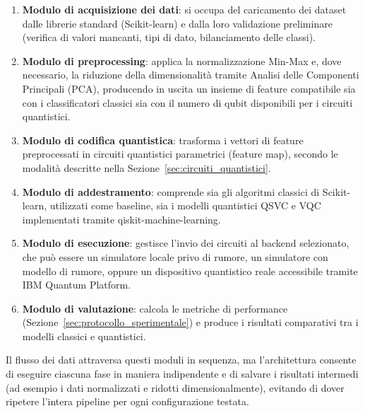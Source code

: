 \begin{enumerate}
    \item \textbf{Modulo di acquisizione dei dati}: si occupa del caricamento dei dataset dalle librerie standard (Scikit-learn) e dalla loro validazione preliminare (verifica di valori mancanti, tipi di dato, bilanciamento delle classi).
    \item \textbf{Modulo di preprocessing}: applica la normalizzazione Min-Max e, dove necessario, la riduzione della dimensionalità tramite Analisi delle Componenti Principali (PCA), producendo in uscita un insieme di feature compatibile sia con i classificatori classici sia con il numero di qubit disponibili per i circuiti quantistici.
    \item \textbf{Modulo di codifica quantistica}: trasforma i vettori di feature preprocessati in circuiti quantistici parametrici (feature map), secondo le modalità descritte nella Sezione~\ref{sec:circuiti_quantistici}.
    \item \textbf{Modulo di addestramento}: comprende sia gli algoritmi classici di Scikit-learn, utilizzati come baseline, sia i modelli quantistici QSVC e VQC implementati tramite qiskit-machine-learning.
    \item \textbf{Modulo di esecuzione}: gestisce l'invio dei circuiti al backend selezionato, che può essere un simulatore locale privo di rumore, un simulatore con modello di rumore, oppure un dispositivo quantistico reale accessibile tramite IBM Quantum Platform.
    \item \textbf{Modulo di valutazione}: calcola le metriche di performance (Sezione~\ref{sec:protocollo_sperimentale}) e produce i risultati comparativi tra i modelli classici e quantistici.
\end{enumerate}

Il flusso dei dati attraversa questi moduli in sequenza, ma l'architettura consente di eseguire ciascuna fase in maniera indipendente e di salvare i risultati intermedi (ad esempio i dati normalizzati e ridotti dimensionalmente), evitando di dover ripetere l'intera pipeline per ogni configurazione testata.

